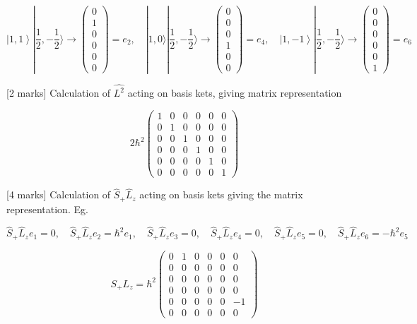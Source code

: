 \documentclass[a4paper,11pt]{article}
\begin{document}
\[
 \left|1, 1 \right> |\frac{1}{2},-\frac{1}{2} \rangle \rightarrow \begin{pmatrix} 0\\ 1\\ 0\\ 0\\ 0\\ 0 \end{pmatrix} = e_2, \quad |1, 0 \rangle |\frac{1}{2}, -\frac{1}{2} \rangle \rightarrow \begin{pmatrix} 0\\ 0\\ 0\\ 1\\ 0\\ 0 \end{pmatrix} = e_4, \quad \left|1, -1 \right>|\frac{1}{2}, -\frac{1}{2} \rangle \rightarrow \begin{pmatrix} 0\\ 0\\ 0\\ 0\\ 0\\ 1 \end{pmatrix} = e_6
\]

[2 marks] Calculation of  \( \hat{L^{2}} \) acting on basis kets, giving matrix representation 

\[ 
2\hbar^2 \begin{pmatrix} 1 & 0 & 0 & 0 & 0 & 0\\  0 & 1 & 0 & 0 & 0 & 0\\ 0 & 0 & 1 & 0 & 0 & 0\\ 0 & 0 & 0 & 1 & 0 & 0\\ 0 & 0 & 0 & 0 & 1 & 0\\ 0 & 0 & 0 & 0 & 0 & 1 \end{pmatrix}
\]

[4 marks] Calculation of \( \hat{S}_{+}\hat{L}_{z} \) acting on basis kets giving the matrix representation. Eg. 

\[
\hat{S}_{+}\hat{L}_{z}e_1 = 0, \quad \hat{S}_{+}\hat{L}_{z}e_2 = \hbar^2e_1, \quad \hat{S}_{+}\hat{L}_{z}e_3 = 0, \quad \hat{S}_{+}\hat{L}_{z}e_4 = 0, \quad \hat{S}_{+}\hat{L}_{z}e_5 = 0, \quad \hat{S}_{+}\hat{L}_{z}e_6 = -\hbar^2e_5 
\]

\[ 
S_{+}L_{z} = \hbar^2 \begin{pmatrix} 0 & 1 & 0 & 0 & 0 & 0\\ 0 & 0 & 0 & 0 & 0 & 0\\ 0 & 0 & 0 & 0 & 0 & 0\\ 0 & 0 & 0 & 0 & 0 & 0\\ 0 & 0 & 0 & 0 & 0 & -1\\ 0 & 0 & 0 & 0 & 0 & 0 \end{pmatrix}
\]
\end{document}
